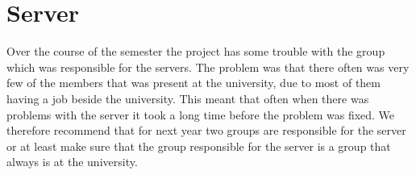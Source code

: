 \section{Server}
Over the course of the semester the project has some trouble with the group which was responsible for the servers. The problem was that there often was very few of the members that was present at the university, due to most of them having a job beside the university. This meant that often when there was problems with the server it took a long time before the problem was fixed. We therefore recommend that for next year two groups are responsible for the server or at least make sure that the group responsible for the server is a group that always is at the university.
